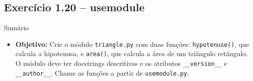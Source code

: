\documentclass[11pt,a4paper]{article}
\begin{document}
\subsection*{Exercício 1.20 -- usemodule}
\begin{exercicio}{Sumário}
\begin{itemize}
    \item \textbf{Objetivo:} Crie o módulo \texttt{triangle.py} com duas funções: \texttt{hypotenuse()}, que calcula a hipotenusa, e \texttt{area()}, que calcula a área de um triângulo retângulo. O módulo deve ter docstrings descritivas e os atributos \texttt{\_\_version\_\_} e \texttt{\_\_author\_\_}. Chame as funções a partir de \texttt{usemodule.py}.
\end{itemize}
\end{exercicio}
\end{document}
